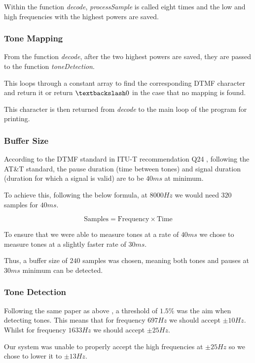 \documentclass{cce2014-design}
\begin{document}
Within the function \textit{decode}, \textit{processSample} is called eight times and the low and high frequencies with the highest powers are saved.

\subsubsection{Tone Mapping}

From the function \textit{decode}, after the two highest powers are saved,
they are passed to the function \textit{toneDetection}.

This loops through a constant array to find the corresponding DTMF character and return it or return $\textbackslash0$ in the case that no mapping is found.

This character is then returned from \textit{decode} to the main loop of the program for printing.

\subsubsection{Buffer Size}

According to the DTMF standard in ITU-T recommendation Q24 \cite{itutrecommendation24}, following the AT\&T standard, the pause duration (time between tones) and signal duration (duration for which a signal is valid) are to be $40ms$ at minimum.

To achieve this, following the below formula, at $8000Hz$ we would need $320$ samples for $40ms$.

$$
   \text{Samples} = \text{Frequency} \times \text{Time}
$$

To ensure that we were able to measure tones at a rate of $40ms$ we chose to measure tones at a slightly faster rate of $30ms$.

Thus, a buffer size of $240$ samples was chosen, meaning both tones and pauses at $30ms$ minimum can be detected.

\subsubsection{Tone Detection}

Following the same paper as above \cite{itutrecommendation24},
a threshold of $1.5\%$ was the aim when detecting tones. This means that for frequency $697Hz$ we should accept $\pm10Hz$. Whilst for frequency $1633Hz$ we should accept $\pm25Hz$.

Our system was unable to properly accept the high frequencies at $\pm25Hz$ so we chose to lower it to $\pm13Hz$.
\end{document}
